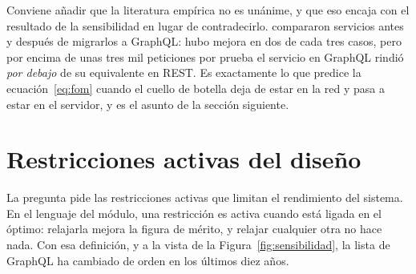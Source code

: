 \documentclass[11pt,letterpaper]{article}
\begin{document}
Conviene añadir que la literatura empírica no es unánime, y que eso encaja con
el resultado de la sensibilidad en lugar de contradecirlo.
\textcite{seabra2019} compararon servicios antes y después de migrarlos a
GraphQL: hubo mejora en dos de cada tres casos, pero por encima de unas tres
mil peticiones por prueba el servicio en GraphQL rindió \emph{por debajo} de su
equivalente en REST. Es exactamente lo que predice la
ecuación~\eqref{eq:fom} cuando el cuello de botella deja de estar en la red y
pasa a estar en el servidor, y es el asunto de la sección siguiente.

\section{Restricciones activas del diseño}
\label{sec:restricciones}

La pregunta pide las restricciones activas que limitan el rendimiento del
sistema. En el lenguaje del módulo, una restricción es activa cuando está
ligada en el óptimo: relajarla mejora la figura de mérito, y relajar cualquier
otra no hace nada. Con esa definición, y a la vista de la
Figura~\ref{fig:sensibilidad}, la lista de GraphQL ha cambiado de orden en los
últimos diez años.
\end{document}
